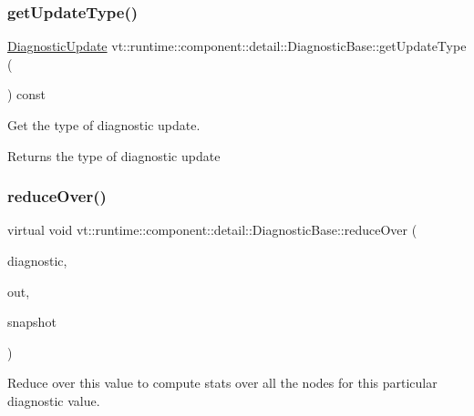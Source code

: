 \subsubsection{\texorpdfstring{get\+Update\+Type()}{getUpdateType()}}
{\footnotesize\ttfamily \hyperlink{namespacevt_1_1runtime_1_1component_a896637e6e183a909a17bfd8d3943c206}{Diagnostic\+Update} vt\+::runtime\+::component\+::detail\+::\+Diagnostic\+Base\+::get\+Update\+Type (\begin{DoxyParamCaption}{ }\end{DoxyParamCaption}) const\hspace{0.3cm}{\ttfamily [inline]}}



Get the type of diagnostic update. 

\begin{DoxyReturn}{Returns}
the type of diagnostic update 
\end{DoxyReturn}
\mbox{\label{structvt_1_1runtime_1_1component_1_1detail_1_1_diagnostic_base_a3a47051d20b9c7c66146eeda75fd7ad6}} 
\subsubsection{\texorpdfstring{reduce\+Over()}{reduceOver()}}
{\footnotesize\ttfamily virtual void vt\+::runtime\+::component\+::detail\+::\+Diagnostic\+Base\+::reduce\+Over (\begin{DoxyParamCaption}\item[{\hyperlink{structvt_1_1runtime_1_1component_1_1_diagnostic}{Diagnostic} $\ast$}]{diagnostic,  }\item[{\hyperlink{structvt_1_1runtime_1_1component_1_1_diagnostic_erased_value}{Diagnostic\+Erased\+Value} $\ast$}]{out,  }\item[{int}]{snapshot }\end{DoxyParamCaption})\hspace{0.3cm}{\ttfamily [pure virtual]}}



Reduce over this value to compute stats over all the nodes for this particular diagnostic value. 


